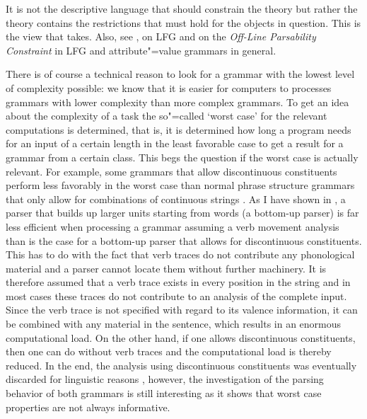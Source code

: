 It is not the descriptive language that should constrain the theory but rather the theory contains the restrictions
that must hold for the objects in question. This is the view that \citet[, 280]{Chomsky81b} takes. Also, see 
,
 on LFG and  on the \emph{Off-Line Parsability Constraint}
in LFG and attribute"=value grammars in general.

There is of course a technical reason to look for a grammar with the lowest level of complexity possible:
we know that it is easier for computers to processes grammars with lower complexity than more
complex grammars. To get an idea about the complexity of a task the so"=called `worst case' for the
relevant computations is determined, that is, it is determined how long a program needs for an input
of a certain length in the least favorable case to get a result for a grammar from a certain class. This begs the question if the worst case is actually relevant. 
For example, some grammars that allow discontinuous constituents perform less favorably in the worst case than normal phrase structure grammars 
that only allow for combinations of continuous strings \citep[Section~8]{Reape91}.
As I have shown in , a parser that builds up larger units starting from words (a bottom-up parser) is far less
efficient when processing a grammar assuming a verb movement analysis than is the case for a bottom-up parser that allows for discontinuous constituents.
This has to do with the fact that verb traces do not contribute any phonological material and a parser cannot locate them without further machinery.
It is therefore assumed that a verb trace exists in every position in the string and in most cases
these traces do not contribute to an analysis of the complete input.
Since the verb trace is not specified with regard to its valence information, it can be combined
with any material in the sentence, which results in an enormous computational load.
On the other hand, if one allows discontinuous constituents, then one can do without verb traces and the computational load is thereby reduced.
In the end, the analysis using discontinuous constituents was eventually discarded for linguistic reasons \citep{Mueller2005c,Mueller2005d,MuellerLehrbuch1,MuellerGS},
however, the investigation of the parsing behavior of both grammars is still interesting as it shows that worst case properties are not always
informative.

